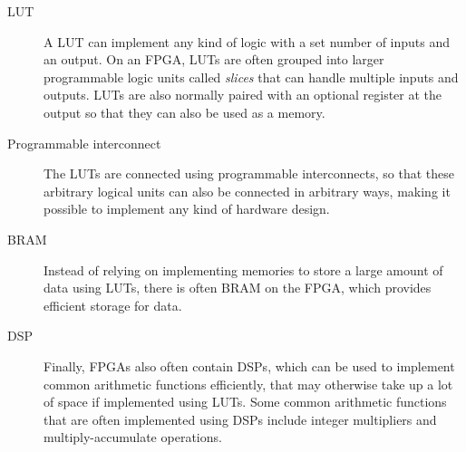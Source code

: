 \begin{description}
\item[\Gls{LUT}] A \gls{LUT} can implement any kind of logic with a set number
  of inputs and an output.  On an \gls{FPGA}, \glspl{LUT} are often grouped into
  larger programmable logic units called \emph{slices} that can handle multiple
  inputs and outputs.  \Glspl{LUT} are also normally paired with an optional
  register at the output so that they can also be used as a memory.
\item[Programmable interconnect] The \glspl{LUT} are connected using
  programmable interconnects, so that these arbitrary logical units can also be
  connected in arbitrary ways, making it possible to implement any kind of
  hardware design.
\item[\Gls{BRAM}] Instead of relying on implementing memories to store a large
  amount of data using \glspl{LUT}, there is often \gls{BRAM} on the \gls{FPGA},
  which provides efficient storage for data.
\item[\Gls{DSP}] Finally, \glspl{FPGA} also often contain \glspl{DSP}, which can
  be used to implement common arithmetic functions efficiently, that may
  otherwise take up a lot of space if implemented using \glspl{LUT}.  Some
  common arithmetic functions that are often implemented using \glspl{DSP}
  include integer multipliers and multiply-accumulate operations.
\end{description}


